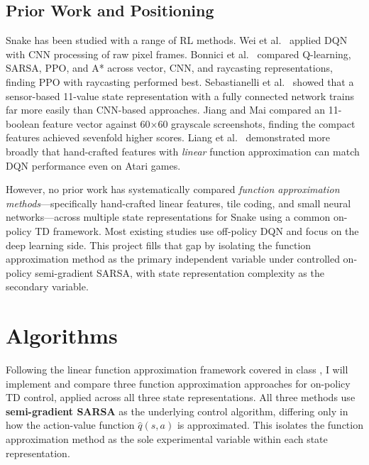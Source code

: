 \documentclass[11pt]{article}
\begin{document}
\subsection{Prior Work and Positioning}

Snake has been studied with a range of RL methods. Wei et al.\ \citep{wei2018autonomous} applied DQN with CNN processing of raw pixel frames. Bonnici et al.\ \citep{bonnici2022exploring} compared Q-learning, SARSA, PPO, and A* across vector, CNN, and raycasting representations, finding PPO with raycasting performed best. Sebastianelli et al.\ \citep{sebastianelli2021deep} showed that a sensor-based 11-value state representation with a fully connected network trains far more easily than CNN-based approaches. Jiang and Mai \citep{jiang2021snakeai} compared an 11-boolean feature vector against 60$\times$60 grayscale screenshots, finding the compact features achieved sevenfold higher scores. Liang et al.\ \citep{liang2016shallow} demonstrated more broadly that hand-crafted features with \emph{linear} function approximation can match DQN performance even on Atari games.

However, no prior work has systematically compared \emph{function approximation methods}---specifically hand-crafted linear features, tile coding, and small neural networks---across multiple state representations for Snake using a common on-policy TD framework. Most existing studies use off-policy DQN and focus on the deep learning side. This project fills that gap by isolating the function approximation method as the primary independent variable under controlled on-policy semi-gradient SARSA, with state representation complexity as the secondary variable.

\section{Algorithms}

Following the linear function approximation framework covered in class \citep{sutton2018reinforcement}, I will implement and compare three function approximation approaches for on-policy TD control, applied across all three state representations. All three methods use \textbf{semi-gradient SARSA} as the underlying control algorithm, differing only in how the action-value function $\hat{q}(s,a)$ is approximated. This isolates the function approximation method as the sole experimental variable within each state representation.
\end{document}
